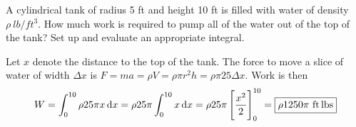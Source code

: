 \documentclass[12pt,answers]{exam}
\begin{document}
\begin{questions}
\newpage
\question
{}

\newpage
\question[10]
A cylindrical tank of radius 5 ft and height 10 ft is filled with water of density $\rho\ \unit{lb/ft^3}$. How much work is required to pump all of the water out of the top of the tank? Set up and evaluate an appropriate integral.
\begin{solution}
    Let $x$ denote the distance to the top of the tank.
    The force to move a slice of water of width $\Delta x$ is $F = ma = \rho V = \rho \pi r^2 h = \rho \pi 25 \Delta x$. 
    Work is then
    \[
        W = \int_0^{10} \rho 25 \pi x \dif x
        = \rho 25 \pi \int_0^{10} x \dif x
        = \rho 25 \pi \left[\frac{x^2}{2} \right]_0^{10}
        = \boxed{\rho 1250 \pi \ \unit{ft.lbs}}
    \]
\end{solution}


\end{questions}
\end{document}
